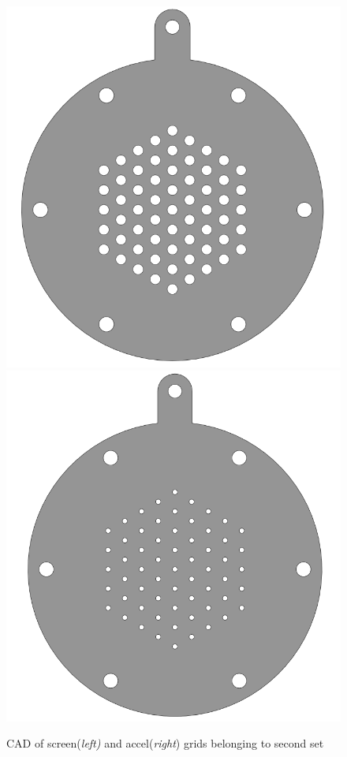 \begin{figure}[ht]
    \centering
    \includegraphics[scale=.25]{fig/screen_5_cad.png}
    \includegraphics[scale=.25]{fig/accel_5_cad.png}
    \caption{CAD of screen(\textit{left)} and accel(\textit{right}) grids belonging to second set}
    \label{fig:cad_secondset}
\end{figure}

